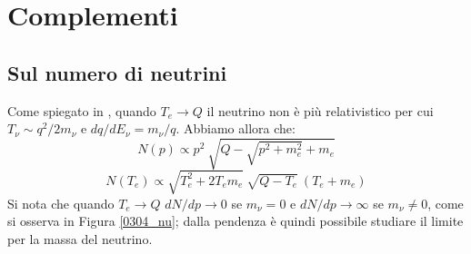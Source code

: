 
\chapter{Complementi}

\section{Sul numero di neutrini}\label{compl-neutrini}
Come spiegato in , quando $T_e \to Q$ il neutrino non è più relativistico per cui $T_\nu\sim q^2/2m_\nu$ e $dq/dE_\nu = m_\nu/q$. Abbiamo allora che:
$$N(p)\propto p^2 \: \sqrt{Q-\sqrt{p^2+m_e^2} + m_e}$$ 
$$N(T_e)\propto \sqrt{T_e^2+2T_em_e} \: \sqrt{Q-T_e} \: (T_e+m_e)$$
Si nota che quando $T_e\to Q$ $dN/dp\to 0$ se $m_\nu = 0$ e $dN/dp\to \infty$ se $m_\nu \not = 0$, come si osserva in Figura \ref{0304_nu}; dalla pendenza è quindi possibile studiare il limite per la massa del neutrino.